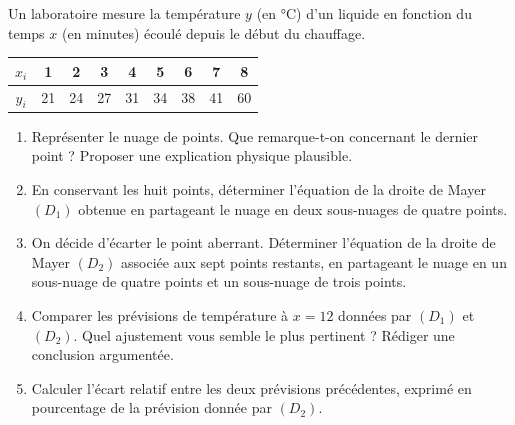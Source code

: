 \documentclass[11pt]{article}
\begin{document}
\begin{exercice}
Un laboratoire mesure la température $y$ (en \si{\celsius}) d'un liquide en fonction du temps $x$ (en minutes) écoulé depuis le début du chauffage.

\begin{center}
\begin{tabular}{|c|c|c|c|c|c|c|c|c|}
\hline
$x_i$ & 1 & 2 & 3 & 4 & 5 & 6 & 7 & 8 \\
\hline
$y_i$ & 21 & 24 & 27 & 31 & 34 & 38 & 41 & 60 \\
\hline
\end{tabular}
\end{center}

\begin{enumerate}
\item Représenter le nuage de points. Que remarque-t-on concernant le dernier point ? Proposer une explication physique plausible.
\item En conservant les huit points, déterminer l'équation de la droite de Mayer $(D_1)$ obtenue en partageant le nuage en deux sous-nuages de quatre points.
\item On décide d'écarter le point aberrant. Déterminer l'équation de la droite de Mayer $(D_2)$ associée aux sept points restants, en partageant le nuage en un sous-nuage de quatre points et un sous-nuage de trois points.
\item Comparer les prévisions de température à $x = 12$ données par $(D_1)$ et $(D_2)$. Quel ajustement vous semble le plus pertinent ? Rédiger une conclusion argumentée.
\item Calculer l'écart relatif entre les deux prévisions précédentes, exprimé en pourcentage de la prévision donnée par $(D_2)$.
\end{enumerate}
\end{exercice}
\end{document}
